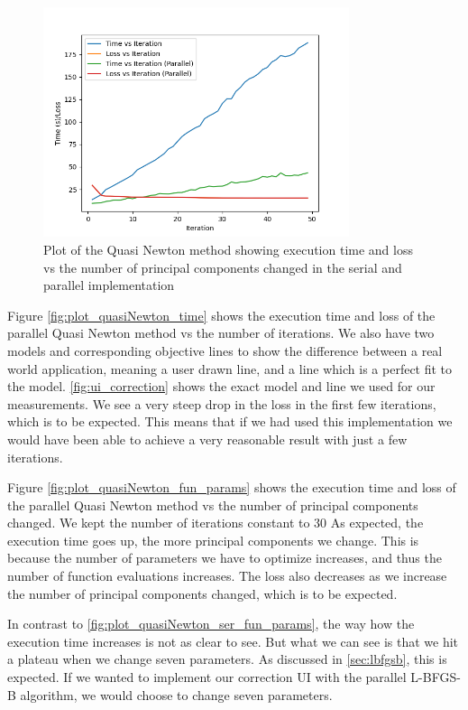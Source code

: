 \begin{figure}[H]
    \centering
    \includegraphics[width = 0.8\textwidth]{figures/plot_quasiNewton_serial_vs_parallel.png}
    \caption[Parallel vs sequential quasi Newton]{Plot of the Quasi Newton method showing execution time and loss vs the number of principal components changed in the serial and parallel implementation}
    \label{fig:plot_quasiNewton_time_ser_vs_par}
\end{figure}

Figure \ref{fig:plot_quasiNewton_time} shows the execution time and loss of the parallel Quasi Newton method vs the number of iterations. We also have two models and corresponding objective lines to
show the difference between a real world application, meaning a user drawn line, and a line which is a perfect fit to the model. \ref{fig:ui_correction} shows the exact model and line we used for our measurements. We see a very steep drop in the loss in the first few iterations,
which is to be expected. This means that if we had used this implementation we would have been able to achieve a very reasonable result with just a few iterations.

Figure \ref{fig:plot_quasiNewton_fun_params} shows the execution time and loss of the parallel Quasi Newton method vs the number of principal components changed. We kept the number of iterations constant to 30
As expected, the execution time goes up, the more principal components we change. This is because the number of parameters we have to optimize increases, 
and thus the number of function evaluations increases. The loss also decreases as we increase the number of principal components changed, which is to be expected.

In contrast to \ref{fig:plot_quasiNewton_ser_fun_params}, the way how the execution time increases is not as clear to see. But what we can see is that we hit a plateau when we change seven parameters. As discussed in \ref{sec:lbfgsb},
this is expected. If we wanted to implement our correction UI with the parallel L-BFGS-B algorithm, we would choose to change seven parameters.

